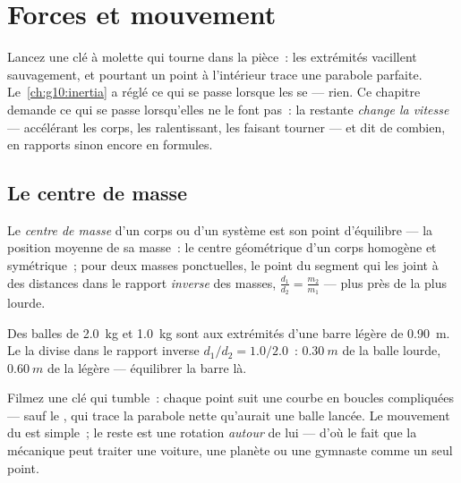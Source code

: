 \chapter{Forces et mouvement}\label{ch:g11:forces-and-motion}

Lancez une clé à molette qui tourne dans la pièce~: les extrémités
vacillent sauvagement, et pourtant un point à l'intérieur trace une
parabole parfaite. Le~\cref{ch:g10:inertia} a réglé ce qui se passe
lorsque les 
se  --- rien. Ce chapitre
demande ce qui se passe lorsqu'elles ne le font pas~: la
 restante \emph{change la vitesse} ---
accélérant les corps, les ralentissant, les faisant tourner --- et dit
de combien, en rapports sinon encore en formules.

\section{Le centre de masse}

\begin{definition}\label{def:g11:forces-and-motion:com}
Le \emph{centre de masse} d'un corps ou d'un
système est son point d'équilibre --- la position moyenne de sa masse~:
le centre géométrique d'un corps homogène et symétrique~; pour deux
masses ponctuelles, le point du segment qui les joint à des distances
dans le rapport \emph{inverse} des masses, $\frac{d_1}{d_2} =
\frac{m_2}{m_1}$ --- plus près de la plus lourde.
\end{definition}

\begin{example}\label{ex:g11:forces-and-motion:dumbbell}
Des balles de \qty{2.0}{kg} et \qty{1.0}{kg} sont aux extrémités d'une
barre légère de \qty{0.90}{m}. Le
 la divise dans le rapport
inverse $d_1/d_2 = 1.0/2.0$~: $\qty{0.30}{m}$ de la balle lourde,
$\qty{0.60}{m}$ de la légère --- équilibrer la barre là.
\end{example}

\begin{remark}\label{rem:g11:forces-and-motion:wrench}
Filmez une clé qui tumble~: chaque point suit une courbe en boucles
compliquées --- sauf le , qui
trace la parabole nette qu'aurait une balle lancée. Le mouvement du
 est simple~; le reste est une
rotation \emph{autour} de lui --- d'où le fait que la mécanique peut
traiter une voiture, une planète ou une gymnaste comme un seul point.
\end{remark}

